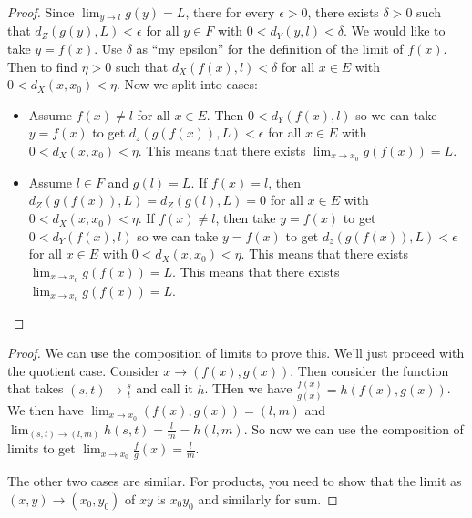 \documentclass{report}
\begin{document}
\begin{proof}
    Since $\lim_{y \to l} g(y) = L$, there for every $\epsilon >0$, there exists $\delta > 0$ such that $d_Z(g(y), L) < \epsilon$ for all $y \in F$ with $0 < d_Y(y, l) < \delta$. We would like to take $y = f(x)$. Use $\delta$ as ``my epsilon'' for the definition of the limit of $f(x)$. Then to find $\eta > 0$ such that $d_X(f(x), l) < \delta$ for all $x \in E$ with $0 < d_X(x, x_0) < \eta$. Now we split into cases:
    \begin{itemize}
        \item Assume $f(x) \neq l$ for all $x \in E$. Then $0 < d_Y(f(x), l)$ so we can take $y = f(x)$ to get $d_z(g(f(x)), L) < \epsilon$  for all $x \in E$ with $0 < d_X(x, x_0) < \eta$. This means that there exists $\lim_{x \to x_0} g(f(x)) = L$.
        \item Assume $l \in F$ and $g(l) = L$. If $f(x) = l$, then $d_Z(g(f(x)), L) = d_Z(g(l), L) = 0$ for all $x \in E$ with $0 < d_X(x, x_0) < \eta$. If $f(x) \neq l$, then take $y = f(x)$ to get $0 < d_Y(f(x), l)$ so we can take $y = f(x)$ to get $d_z(g(f(x)), L) < \epsilon$  for all $x \in E$ with $0 < d_X(x, x_0) < \eta$. This means that there exists $\lim_{x \to x_0} g(f(x)) = L$.
        This means that there exists $\lim_{x \to x_0} g(f(x)) = L$.
    \end{itemize}
\end{proof}
\begin{proof}
    We can use the composition of limits to prove this. We'll just proceed with the quotient case. Consider $x \to (f(x), g(x))$. Then consider the function that takes $(s, t) \to \frac{s}{t}$ and call it $h$. THen we have $\frac{f(x)}{g(x)} = h(f(x), g(x))$. We then have $\lim_{x \to x_0} (f(x), g(x)) = (l, m)$ and $\lim_{(s, t) \to (l, m)} h(s, t) = \frac{l}{m} = h(l, m)$. So now we can use the composition of limits to get $\lim_{x \to x_0} \frac{f}{g}(x) = \frac{l}{m}$.

    The other two cases are similar. For products, you need to show that the limit as $(x,y) \to (x_0, y_0)$ of $xy$ is $x_0y_0$ and similarly for sum.
\end{proof}
\end{document}

